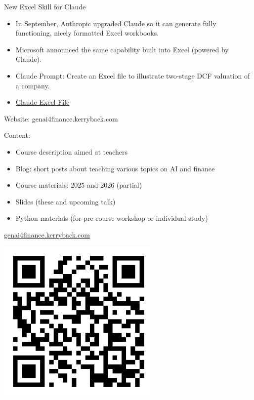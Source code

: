 \documentclass{beamer}
\begin{document}
\begin{frame}{New Excel Skill for Claude}
\begin{itemize}
\item 
In September, Anthropic upgraded Claude so it can generate fully functioning, nicely formatted Excel workbooks.
\item Microsoft announced the same capability built into Excel (powered by Claude).
\item Claude Prompt: Create an Excel file to illustrate two-stage DCF valuation of a company.
\item \href{https://genai4finance.kerryback.com/claude-dcf-example.xlsx}{Claude Excel File}
\end{itemize}
\end{frame}

\begin{frame}{Website: genai4finance.kerryback.com}

Content:
\begin{itemize}
\item Course description aimed at teachers
\item Blog: short posts about teaching various topics on AI and finance 
\item Course materials: 2025 and 2026 (partial)
\item Slides (these and upcoming talk)
\item Python materials (for pre-course workshop or individual study)
\end{itemize}
\end{frame} 

\begin{frame}{\href{https://genai4finance.kerryback.com}{genai4finance.kerryback.com}}
\begin{center}
\includegraphics[width=0.6\textwidth]{genai4finance_qr.png}
\end{center}
\end{frame}
\end{document}

